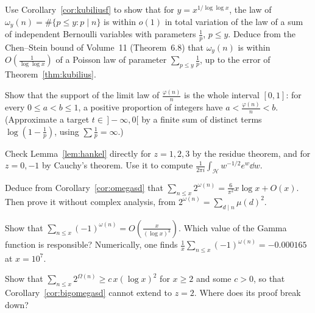 \begin{exercise}[$\star\star$]\label{ex:kubiliusomega}
Use Corollary~\ref{cor:kubiliusf} to show that for $y=x^{1/\log\log x}$, the law of $\omega_y(n)=\#\{p\le y:p\mid n\}$ is within $o(1)$ in total variation of the law of a sum of independent Bernoulli variables with parameters $\frac1p$, $p\le y$. Deduce from the Chen--Stein bound of Volume~11 (Theorem~6.8) that $\omega_y(n)$ is within $O(\frac1{\log\log x})$ of a Poisson law of parameter $\sum_{p\le y}\frac1p$, up to the error of Theorem~\ref{thm:kubilius}.
\end{exercise}

\begin{exercise}[$\star\star\star$]\label{ex:phisupport}
Show that the support of the limit law of $\frac{\varphi(n)}n$ is the whole interval $[0,1]$: for every $0\le a<b\le1$, a positive proportion of integers have $a<\frac{\varphi(n)}n<b$. (Approximate a target $t\in\,]-\infty,0[$ by a finite sum of distinct terms $\log(1-\frac1p)$, using $\sum\frac1p=\infty$.)
\end{exercise}

\begin{exercise}[$\star$]\label{ex:hankelint}
Check Lemma~\ref{lem:hankel} directly for $z=1,2,3$ by the residue theorem, and for $z=0,-1$ by Cauchy's theorem. Use it to compute $\frac1{2\pi i}\int_{\mathcal H}w^{-1/2}e^w\dd w$.
\end{exercise}

\begin{exercise}[$\star$]\label{ex:twoomega}
Deduce from Corollary~\ref{cor:omegasd} that $\sum_{n\le x}2^{\omega(n)}=\frac6{\pi^2}x\log x+O(x)$. Then prove it without complex analysis, from $2^{\omega(n)}=\sum_{d\mid n}\mu(d)^2$.
\end{exercise}

\begin{exercise}[$\star\star$]\label{ex:minusone}
Show that $\sum_{n\le x}(-1)^{\omega(n)}=O(\frac x{(\log x)^3})$. Which value of the Gamma function is responsible? Numerically, one finds $\frac1x\sum_{n\le x}(-1)^{\omega(n)}=-0.000165$ at $x=10^7$.
\end{exercise}

\begin{exercise}[$\star\star$]\label{ex:bigomegasd}
Show that $\sum_{n\le x}2^{\Omega(n)}\ge c\,x(\log x)^2$ for $x\ge2$ and some $c>0$, so that Corollary~\ref{cor:bigomegasd} cannot extend to $z=2$. Where does its proof break down?
\end{exercise}

